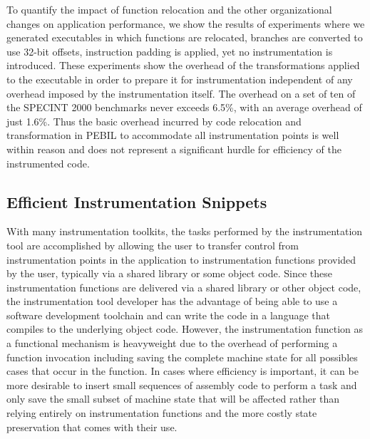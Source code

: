 To quantify the impact of function relocation and the other organizational changes
on application performance, we show the results of experiments
where we generated executables in which functions are relocated, branches are converted to use 32-bit offsets, 
instruction padding is applied, yet no instrumentation is introduced. 
These experiments show the overhead of the transformations applied to the executable 
in order to prepare it for instrumentation independent of any overhead imposed by the 
instrumentation itself. The overhead on a set of ten of the 
SPECINT 2000 benchmarks never exceeds 6.5\%, with an average
overhead of just 1.6\%. Thus the basic overhead incurred by code relocation and transformation in PEBIL to accommodate all instrumentation points is
well within reason and does not represent a significant hurdle for efficiency of the instrumented code.

\subsection{Efficient Instrumentation Snippets}

With many instrumentation toolkits, the tasks performed by the instrumentation tool are accomplished by allowing the user
to transfer control from instrumentation points in the application to instrumentation functions provided by the user, typically
via a shared library or some object code. Since these instrumentation functions are delivered via a shared library or other
object code, the instrumentation tool developer has the advantage of being able to use a software development toolchain and can
write the code in a language that compiles to the underlying object code. However, 
the instrumentation function as a functional mechanism is heavyweight due to 
the overhead of performing a function invocation including saving 
the complete machine state for all possibles cases that occur in the function. In cases where
efficiency is important, it can be more desirable to insert small sequences of assembly code to perform a task and only
save the small subset of machine state that will be affected rather than relying entirely on instrumentation functions and the
more costly state preservation that comes with their use.

